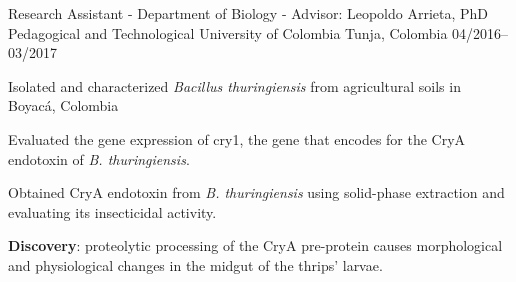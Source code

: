 \begin{cventries}
\cventry
{Research Assistant - Department of Biology - Advisor: Leopoldo Arrieta, PhD}
{Pedagogical and Technological University of Colombia}
{Tunja, Colombia}
{04/2016--03/2017}
{}
\vspace{-0.8cm}
\cventry
{}
{}
{}
{}
{
\begin{cvitems} %
\item {Isolated and characterized \textit{Bacillus thuringiensis} from agricultural soils in Boyacá, Colombia}
\item {Evaluated the gene expression of cry1, the gene that encodes for the CryA endotoxin of \textit{B. thuringiensis}.}
\item {Obtained CryA endotoxin from \textit{B. thuringiensis} using solid-phase extraction and evaluating its insecticidal activity.}
\item {\textbf{Discovery}: proteolytic processing of the CryA pre-protein causes morphological and physiological changes in the midgut of the thrips' larvae.}
\end{cvitems}
}

\vspace{0.5cm}
  

      


\end{cventries}
